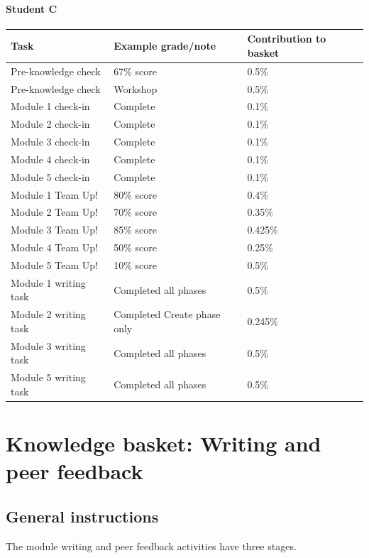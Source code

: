 \documentclass[
  openany]{book}
\begin{document}
\hypertarget{student-c}{%
\subsubsection{Student C}\label{student-c}}

\begin{longtable}[]{@{}lll@{}}
\toprule
Task & Example grade/note & Contribution to basket \\
\midrule
\endhead
Pre-knowledge check & 67\% score & 0.5\% \\
Pre-knowledge check & Workshop & 0.5\% \\
Module 1 check-in & Complete & 0.1\% \\
Module 2 check-in & Complete & 0.1\% \\
Module 3 check-in & Complete & 0.1\% \\
Module 4 check-in & Complete & 0.1\% \\
Module 5 check-in & Complete & 0.1\% \\
Module 1 Team Up! & 80\% score & 0.4\% \\
Module 2 Team Up! & 70\% score & 0.35\% \\
Module 3 Team Up! & 85\% score & 0.425\% \\
Module 4 Team Up! & 50\% score & 0.25\% \\
Module 5 Team Up! & 10\% score & 0.5\% \\
Module 1 writing task & Completed all phases & 0.5\% \\
Module 2 writing task & Completed Create phase only & 0.245\% \\
Module 3 writing task & Completed all phases & 0.5\% \\
Module 5 writing task & Completed all phases & 0.5\% \\
\bottomrule
\end{longtable}

\hypertarget{knowledge-basket-writing-and-peer-feedback}{%
\chapter{Knowledge basket: Writing and peer feedback}\label{knowledge-basket-writing-and-peer-feedback}}

\hypertarget{writinggeneral}{%
\section{General instructions}\label{writinggeneral}}

The module writing and peer feedback activities have three stages.
\end{document}
